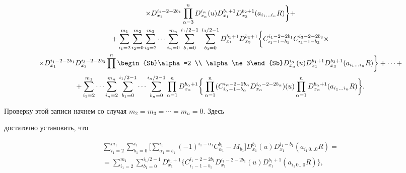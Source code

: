 \begin{multline}
% 


\times D^{i_1-2-2b_1}_{x_1}\prod^n_{\alpha=3} 


D^{i_\alpha}_{x_\alpha}(u)D^{b_1+1}_{x_1}D^{b_2+1}_{x_2} 


(a_{i_1\dotsc i_n}R)\bigg\}+ \\ 


% 


+\sum^{m_1}_{i_1=2}\sum^{m_2}_{i_2=0}\sum^{m_3}_{i_3=2}\dotsb


\sum^{m_n}_{i_n=0}\sum^{i_1/2-1}_{b_1=0}\; 


\sum^{i_3/2-1}_{b_3=0}D^{b_1+1}_{x_1}D^{b_3+1}_{x_3}\bigg\{ 


C^{i_1-2-2b_1}_{i_1-1-b_1}C^{i_3-2-2b_3}_{i_3-1-b_3}\times \\ 


%


\times D^{i_1-2-2b_1}_{x_1}D^{i_3-2-2b_3}_{x_3} 


\prod^n\begin{Sb}\alpha=2 \\ \alpha\ne3\end{Sb} 


D^{i_\alpha}_{x_\alpha}(u)D^{b_1+1}_{x_1}D^{b_3+1}_{x_3} 


(a_{i_1\dotsc i_n}R)\bigg\}+\dotsb+ \\ 


%


+\sum^{m_1}_{i_1=2}\dotsb\sum^{m_n}_{i_n=2} 


\sum^{i_1/2-1}_{b_1=0}\dotsb\sum^{i_n/2-1}_{b_n=0} 


\prod^n_{\alpha=1}D^{b_\alpha+1}_{x_\alpha}\bigg\{ 


\prod^n_{\alpha=1}(C^{i_\alpha-2-2b_\alpha}_{i_\alpha-1-b_\alpha} 


D^{i_\alpha-2-2b_\alpha}_{x_\alpha})(u)\prod^n_{\alpha=1} 


D^{b_\alpha+1}_{x_\alpha}(a_{i_1\dotsc i_n}R)\bigg\}. 


\end{multline} 


 


Проверку этой записи начнем со случая $m_2=m_3=\dotsb=m_n=0$. Здесь 


достаточно установить, что 


\begin{multline*} 


\sum^{m_1}_{i_1=2}\sum^{i_1}_{b_1=0}\bigg[ 


\sum^{i_1}_{\alpha_1=b_1}(-1)^{i_1-\alpha_1} 


C^{b_1}_{\alpha_1}-M_{b_1}\bigg]D^{b_1}_{x_1}(u) 


D^{i_1-b_1}_{x_1}(a_{i_1\,0\dotsc 0}R)=\\ 


% 


=\sum^{m_1}_{i_1=2}\sum^{i_1/2-1}_{b_1=0}D^{b_1+1}_{x_1} 


\{C^{i_1-2-2b_1}_{i_1-1-b_1}D^{i_1-2-2b_1}_{x_1}(u) 


D^{b_1+1}_{x_1}(a_{i_1\,0\dotsc 0}R)\}, 


\end{multline*} 


